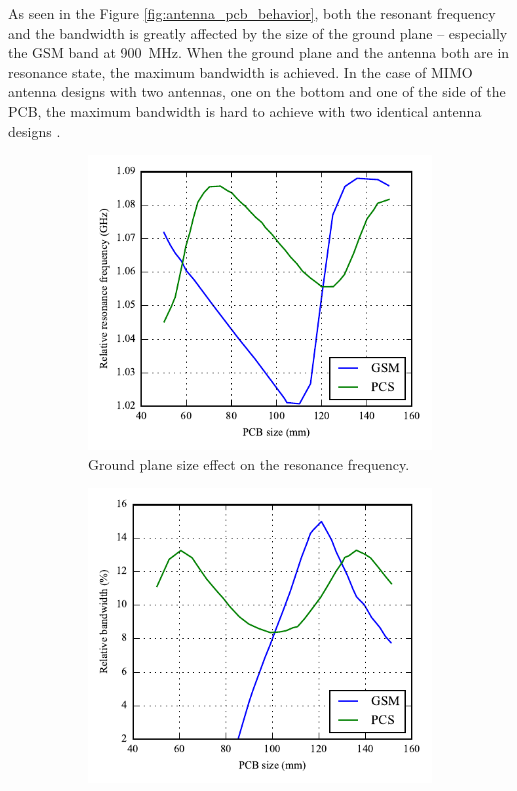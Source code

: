 As seen in the Figure \ref{fig:antenna_pcb_behavior}, both the resonant frequency and the bandwidth is greatly affected by the size of the ground plane -- especially the GSM band at \SI{900}{MHz}. When the ground plane and the antenna both are in resonance state, the maximum bandwidth is achieved. In the case of MIMO antenna designs with two antennas, one on the bottom and one of the side of the PCB, the maximum bandwidth is hard to achieve with two identical antenna designs \cite{sanchez2008multiband}. 

\begin{figure}[htbp]
   \begin{subfigure}[b]{0.49\linewidth}
        \centering
        \includegraphics{img/analysis/pcbsize_freq.pdf}
        \caption{Ground plane size effect on the resonance frequency.}
    \end{subfigure}
    \hfill
    \begin{subfigure}[b]{0.49\linewidth}
        \centering
        \includegraphics{img/analysis/pcbsize_bandwidth.pdf}

\end{subfigure}
\end{figure}
